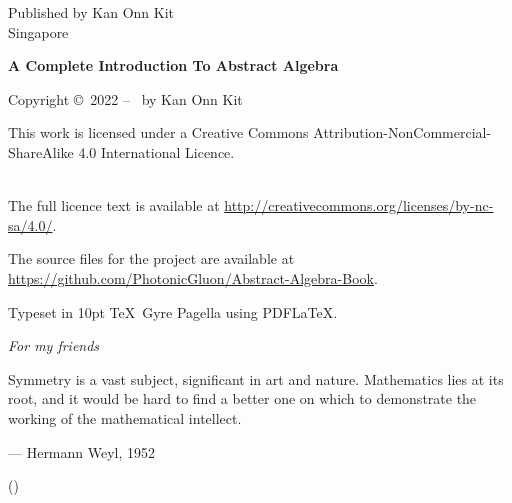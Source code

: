 \clearpage\null\vfill
\thispagestyle{empty}
\begin{minipage}[b]{0.9\textwidth}
    \footnotesize\raggedright
    \setlength{\parskip}{0.5\baselineskip}

    Published by Kan Onn Kit\\
    Singapore
    \vspace{5cm}

    \textbf{A Complete Introduction To Abstract Algebra}\par
    \editiontext
    \vspace{0.3cm}

    Copyright \copyright \ 2022 -- \the\year\ by Kan Onn Kit\par
    This work is licensed under a
    Creative Commons Attribution-NonCommercial-ShareAlike 4.0 International Licence.\par
    \\
    The full licence text is available at \url{http://creativecommons.org/licenses/by-nc-sa/4.0/}.\par    
    The source files for the project are available at \url{https://github.com/PhotonicGluon/Abstract-Algebra-Book}.
    \vspace{0.3cm}

    Typeset in 10pt \TeX~Gyre Pagella using PDF\LaTeX.
\end{minipage}

\vspace*{2\baselineskip}
\cleardoublepage

\thispagestyle{empty}
\vspace*{1cm}

\begin{center}
    {\fontsize{18pt}{0}\selectfont \textit{For my friends}}\\
\end{center}

\vspace*{1.5cm}

\begin{center}
    \Large{\parbox{10cm}{
        \begin{raggedright}
            \Large
            Symmetry is a vast subject, significant in art and nature. Mathematics lies at its root, and it would be hard to find a better one on which to demonstrate the working of the mathematical intellect.
            \vspace{0.3cm}
            
            \hfill
            --- Hermann Weyl, 1952\\
            \vspace{-0.25cm}
            
            \hfill
            \normalsize
            ({\cite[p.~145]{weyl_1952}})
        \end{raggedright}
    }
}
\end{center}


